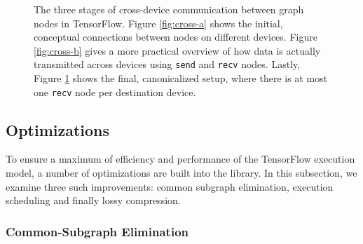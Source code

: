 \begin{figure}
\begin{subfigure}[h]{0.30\textwidth}
    \label{fig:cross-c}
    \caption{}
  \end{subfigure}
  \label{fig:cross}
  \caption{The three stages of cross-device communication between graph nodes in
    TensorFlow. Figure \ref{fig:cross-a} shows the initial, conceptual
    connections between nodes on different devices. Figure \ref{fig:cross-b}
    gives a more practical overview of how data is actually transmitted across
    devices using \texttt{send} and \texttt{recv} nodes. Lastly, Figure
    \ref{fig:cross-c} shows the final, canonicalized setup, where there is at
    most one \texttt{recv} node per destination device.}
\end{figure}

\subsection{Optimizations}\label{sec:model-optim}

To ensure a maximum of efficiency and performance of the TensorFlow execution
model, a number of optimizations are built into the library. In this subsection,
we examine three such improvements: common subgraph elimination, execution
scheduling and finally lossy compression.

\subsubsection{Common-Subgraph Elimination}\label{sec:model-optim-common}

